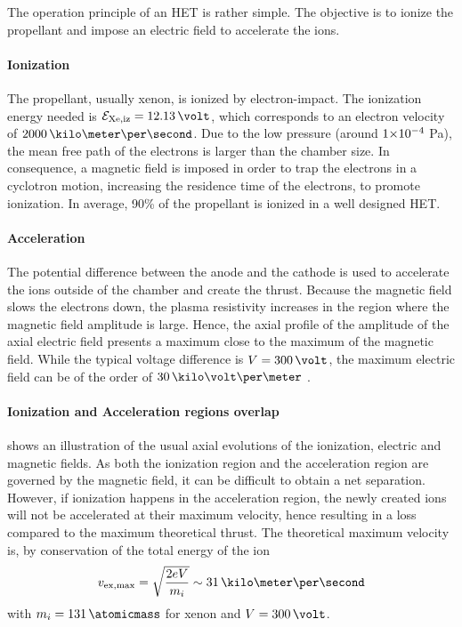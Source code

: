   The operation principle of an \ac{HET} is rather simple.
  The objective is to ionize the propellant and impose an electric field to accelerate the ions.

  \paragraph{Ionization\\}
  The propellant, usually xenon, is ionized by electron-impact.
  The ionization energy needed is $\mathcal{E}_{\rm Xe, iz} = 12.13 \,\volt$, which corresponds to an electron velocity of $2000\,\kilo\meter\per\second$.
  Due to the low pressure (around ${{1}{\times}10^{-4}}$ Pa), the mean free path of the electrons is larger than the chamber size.
  In consequence, a magnetic field is imposed in order to trap the electrons in a cyclotron motion, increasing the residence time of the electrons, to promote  ionization.
  In average, 90\% of the propellant is ionized in a well designed \ac{HET}.

  \paragraph{Acceleration\\}
  The potential difference  between the anode and the cathode is used to accelerate the ions outside of the chamber and create the thrust.
  Because the magnetic field slows the electrons down, the plasma resistivity increases in the region where the magnetic field amplitude is large.
  Hence, the axial profile of the amplitude of the axial electric field presents a maximum close to the maximum of the magnetic field.
  While the typical voltage difference is $V=300\,\volt$, the maximum electric field can be of the order of $30\,\kilo\volt\per\meter$ \citep{gawron2008}.

  \paragraph{Ionization and Acceleration regions overlap\\}
   shows an illustration of the usual axial evolutions of the ionization, electric and magnetic fields.
  As both the ionization region and the acceleration region are governed by the magnetic field, it can be difficult to obtain a net separation.
  However, if ionization happens in the acceleration region, the newly created ions will not be accelerated at their maximum velocity, hence resulting in a loss compared to the maximum theoretical thrust.
  The theoretical maximum velocity is, by conservation of the total energy of the ion
  \begin{equation} \label{eq-vmaxtheo}
    v_{\rm ex, max} = \sqrt{ \frac{2 e V}{m_i} } \sim 31 \,\kilo\meter\per\second
  \end{equation}
  with $m_i = 131 \,\atomicmass$ for xenon and $V=300\,\volt$.


